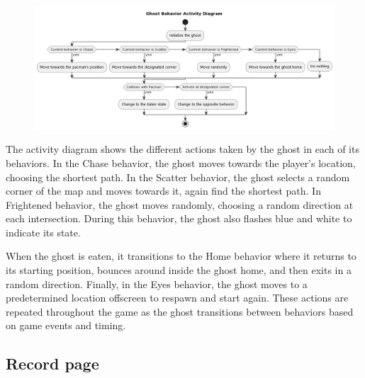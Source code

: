 \documentclass[11pt]{article}
\begin{document}
\begin{figure}[H]
    \centering
    \includegraphics*[scale=0.4]{Ghost_Activity.png}
\end{figure}

The activity diagram shows the different actions taken by the ghost in each of its behaviors. In the Chase behavior, the ghost moves towards the player's location, choosing the shortest path. In the Scatter behavior, the ghost selects a random corner of the map and moves towards it, again find the shortest path. In Frightened behavior, the ghost moves randomly, choosing a random direction at each intersection. During this behavior, the ghost also flashes blue and white to indicate its state.

When the ghost is eaten, it transitions to the Home behavior where it returns to its starting position, bounces around inside the ghost home, and then exits in a random direction. Finally, in the Eyes behavior, the ghost moves to a predetermined location offscreen to respawn and start again. These actions are repeated throughout the game as the ghost transitions between behaviors based on game events and timing.

\subsection{Record page}
\end{document}
